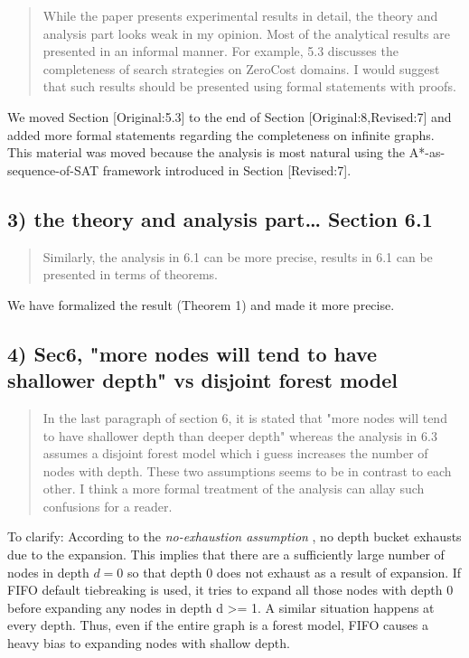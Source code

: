 \documentclass{article}
\begin{document}
\begin{quote}
 While the paper presents experimental results in detail, the theory
and analysis part looks weak in my opinion. Most of the analytical
results are presented in an informal manner. For example, 5.3
discusses the completeness of search strategies on ZeroCost domains. I
would suggest that such results should be presented using formal
statements with proofs.
\end{quote}

We moved Section [Original:5.3]
to the end of Section [Original:8,Revised:7] and added more formal statements regarding the completeness 
on infinite graphs. This material was moved because the analysis is most natural 
using the A*-as-sequence-of-SAT framework introduced in Section [Revised:7].

\subsection{3) the theory and analysis part\ldots{} Section 6.1}
\label{sec:orgheadline17}

\begin{quote}
Similarly, the analysis in 6.1 can be more
precise, results in 6.1 can be presented in terms of theorems.
\end{quote}

We have formalized the result (Theorem 1) and made it more precise.

\subsection{4) Sec6, "more nodes will tend to have shallower depth" vs disjoint forest model}
\label{sec:orgheadline18}

\begin{quote}
 In the last paragraph of section 6, it is stated that "more nodes
will tend to have shallower depth than deeper depth" whereas the
analysis in 6.3 assumes a disjoint forest model which i guess
increases the number of nodes with depth. These two assumptions seems
to be in contrast to each other. I think a more formal treatment of
the analysis can allay such confusions for a reader.
\end{quote}

To clarify: According to the \emph{no-exhaustion assumption} , no depth bucket exhausts due to the expansion.
This implies that there are a sufficiently large number of nodes in depth \(d=0\) so that
 depth 0 does not exhaust as a result of expansion.
If FIFO default tiebreaking is used,
it tries to expand all those nodes with depth 0 before expanding any nodes in depth d >= 1.
A similar situation happens at every depth.
Thus, even if the entire graph is a forest model, FIFO causes a heavy bias to expanding nodes with shallow depth.
\end{document}
